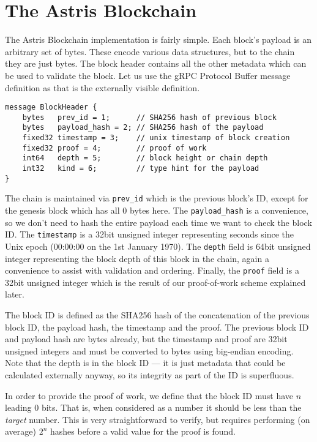 \chapter{The Astris Blockchain}
\label{appendix:blockchain}

The Astris Blockchain implementation is fairly simple. Each block's payload is an arbitrary set of bytes. These encode various data structures, but to the chain they are just bytes. The block header contains all the other metadata which can be used to validate the block. Let us use the gRPC Protocol Buffer message definition as that is the externally visible definition.

\begin{lstlisting}[language=protobuf3, style=protobuf]
message BlockHeader {
    bytes   prev_id = 1;      // SHA256 hash of previous block
    bytes   payload_hash = 2; // SHA256 hash of the payload
    fixed32 timestamp = 3;    // unix timestamp of block creation
    fixed32 proof = 4;        // proof of work
    int64   depth = 5;        // block height or chain depth
    int32   kind = 6;         // type hint for the payload
}
\end{lstlisting}

The chain is maintained via \texttt{prev\_id} which is the previous block's ID, except for the genesis block which has all $0$ bytes here. The \texttt{payload\_hash} is a convenience, so we don't need to hash the entire payload each time we want to check the block ID. The \texttt{timestamp} is a 32bit unsigned integer representing seconds since the Unix epoch (00:00:00 on the 1st January 1970). The \texttt{depth} field is 64bit unsigned integer representing the block depth of this block in the chain, again a convenience to assist with validation and ordering. Finally, the \texttt{proof} field is a 32bit unsigned integer which is the result of our proof-of-work scheme explained later.

The block ID is defined as the SHA256 hash of the concatenation of the previous block ID, the payload hash, the timestamp and the proof. The previous block ID and payload hash are bytes already, but the timestamp and proof are 32bit unsigned integers and must be converted to bytes using big-endian encoding. Note that the depth is in the block ID --- it is just metadata that could be calculated externally anyway, so its integrity as part of the ID is superfluous.

In order to provide the proof of work, we define that the block ID must have $n$ leading 0 bits. That is, when considered as a number it should be less than the \emph{target} number. This is very straightforward to verify, but requires performing (on average) $2^n$ hashes before a valid value for the proof is found.





